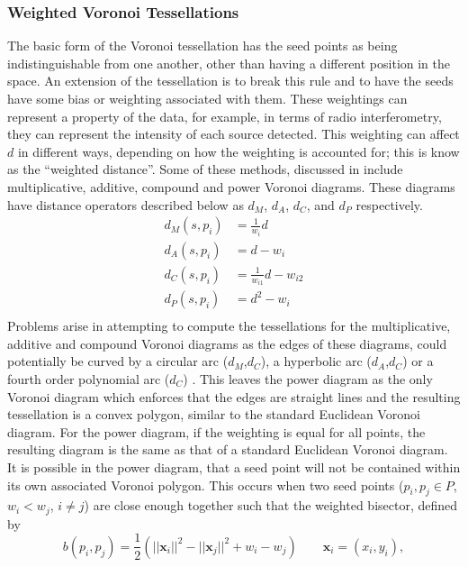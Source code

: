 \subsubsection{Weighted Voronoi Tessellations}\label{tes:ssec:wei}
The basic form of the Voronoi tessellation has the seed points as being indistinguishable from one another, other than having a different position in the space. An extension of the tessellation is to break this rule and to have the seeds have some bias or weighting associated with them. These weightings can represent a property of the data, for example, in terms of radio interferometry, they can represent the intensity of each source detected. This weighting can affect $d$ in different ways, depending on how the weighting is accounted for; this is know as the ``weighted distance''. Some of these methods, discussed in \citet{okabe2009spatial} include multiplicative, additive, compound and power Voronoi diagrams. These diagrams have distance operators described below as $d_M$, $d_A$, $d_C$, and $d_P$ respectively.
%
\begin{equation*}
\begin{aligned}
  d_M(s,p_i) &= \frac{1}{w_i}d			\\
  d_A(s,p_i) &= d - w_i				\\
  d_C(s,p_i) &= \frac{1}{w_{i1}}d - w_{i2}	\\
  d_P(s,p_i) &= d^2 - w_i			\\
\end{aligned}
\end{equation*}
%
Problems arise in attempting to compute the tessellations for the multiplicative, additive and compound Voronoi diagrams as the edges of these diagrams, could potentially be curved by a circular arc ($d_M$,$d_C$), a hyperbolic arc ($d_A$,$d_C$) or a fourth order polynomial arc ($d_C$) \citep{okabe2009spatial}. This leaves the power diagram as the only Voronoi diagram which enforces that the edges are straight lines and the resulting tessellation is a convex polygon, similar to the standard Euclidean Voronoi diagram. For the power diagram, if the weighting is equal for all points, the resulting diagram is the same as that of a standard Euclidean Voronoi diagram. It is possible in the power diagram, that a seed point will not be contained within its own associated Voronoi polygon. This occurs when two seed points ($p_i,p_j \in P$, $w_i<w_j$, $i\neq j$) are close enough together such that the weighted bisector, defined by 
%
\begin{equation}
 b(p_i,p_j) = \frac{1}{2}(||\mathbf{x}_i||^2-||\mathbf{x}_j||^2+w_i-w_j) \qquad \mathbf{x}_i = (x_i,y_i),
\end{equation}
